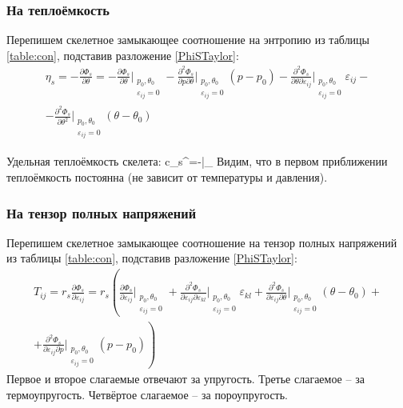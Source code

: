 \documentclass[main.tex]{subfiles}
\begin{document}
\subsubsection{На теплоёмкость}
Перепишем скелетное замыкающее соотношение на энтропию из таблицы \ref{table:con}, подставив разложение \ref{PhiSTaylor}:
\begin{multline}
\eta_s=-\frac{\partial\Phi_s}{\partial\theta}=-\frac{\partial\Phi_s}{\partial\theta}\bigg|_{\substack{p_0,\theta_0\\\varepsilon_{ij}=0}}-\frac{\partial^2\Phi_s}{\partial p\partial\theta}\bigg|_{\substack{p_0,\theta_0\\\varepsilon_{ij}=0}}\left(p-p_0\right)-\frac{\partial^2\Phi_s}{\partial\theta\partial\varepsilon_{ij}}\bigg|_{\substack{p_0,\theta_0\\\varepsilon_{ij}=0}}\varepsilon_{ij}-\\-\frac{\partial^2\Phi_s}{\partial\theta^2}\bigg|_{\substack{p_0,\theta_0\\\varepsilon_{ij}=0}}\left(\theta-\theta_0\right)
\end{multline}

Удельная теплоёмкость скелета:
\beq
c_s^\theta=\theta{}\approx -\theta{}\bigg|_{}
\eeq
Видим, что в первом приближении теплоёмкость постоянна (не зависит от температуры и давления).

\subsubsection{На тензор полных напряжений}
Перепишем скелетное замыкающее соотношение на тензор полных напряжений из таблицы \ref{table:con}, подставив разложение \ref{PhiSTaylor}:
\begin{multline}\label{TIJ}
T_{ij}=r_s\frac{\partial\Phi_s}{\partial\varepsilon_{ij}}=r_s\left(\frac{\partial\Phi_s}{\partial\varepsilon_{ij}}\bigg|_{\substack{p_0,\theta_0\\\varepsilon_{ij}=0}}+\frac{\partial^2\Phi_s}{\partial\varepsilon_{ij}\partial\varepsilon_{kl}}\bigg|_{\substack{p_0,\theta_0\\\varepsilon_{ij}=0}}\varepsilon_{kl}+\frac{\partial^2\Phi_s}{\partial\varepsilon_{ij}\partial\theta}\bigg|_{\substack{p_0,\theta_0\\\varepsilon_{ij}=0}}\left(\theta-\theta_0\right)+\right. \\ \left.+\frac{\partial^2\Phi_s}{\partial\varepsilon_{ij}\partial p}\bigg|_{\substack{p_0,\theta_0\\\varepsilon_{ij}=0}}\left(p-p_0\right)\right)
\end{multline}
Первое и второе слагаемые отвечают за упругость. Третье слагаемое -- за термоупругость. Четвёртое слагаемое -- за пороупругость.
\end{document}
